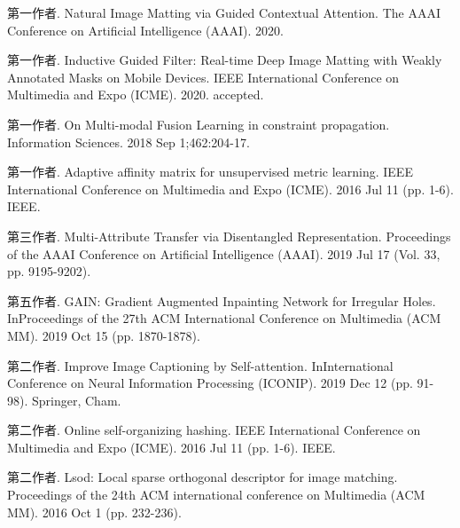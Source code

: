 \begin{publications*}
  \item 第一作者. Natural Image Matting via Guided Contextual Attention. The AAAI Conference on Artificial Intelligence (AAAI). 2020.
  \item 第一作者. Inductive Guided Filter: Real-time Deep Image Matting with Weakly Annotated Masks on Mobile Devices. IEEE International Conference on Multimedia and Expo (ICME). 2020. accepted.
  \item 第一作者. On Multi-modal Fusion Learning in constraint propagation. Information Sciences. 2018 Sep 1;462:204-17.
  \item 第一作者. Adaptive affinity matrix for unsupervised metric learning. IEEE International Conference on Multimedia and Expo (ICME). 2016 Jul 11 (pp. 1-6). IEEE.
  \item 第三作者. Multi-Attribute Transfer via Disentangled Representation. Proceedings of the AAAI Conference on Artificial Intelligence (AAAI). 2019 Jul 17 (Vol. 33, pp. 9195-9202).
  \item 第五作者. GAIN: Gradient Augmented Inpainting Network for Irregular Holes. InProceedings of the 27th ACM International Conference on Multimedia (ACM MM). 2019 Oct 15 (pp. 1870-1878).
  \item 第二作者. Improve Image Captioning by Self-attention. InInternational Conference on Neural Information Processing (ICONIP). 2019 Dec 12 (pp. 91-98). Springer, Cham.
  \item 第二作者. Online self-organizing hashing. IEEE International Conference on Multimedia and Expo (ICME). 2016 Jul 11 (pp. 1-6). IEEE.
  \item 第二作者. Lsod: Local sparse orthogonal descriptor for image matching. Proceedings of the 24th ACM international conference on Multimedia (ACM MM). 2016 Oct 1 (pp. 232-236).

\end{publications*}

